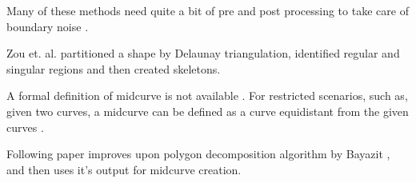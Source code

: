 Many of these methods need quite a bit of pre and post processing to take care of boundary noise \citep{Lien2004}. 

Zou et. al.\citep{Zou2001} partitioned a shape by Delaunay triangulation, identified regular and singular regions and then created skeletons.

A formal definition of midcurve is not available \citep{Ramanathan2004}. For restricted scenarios, such as, given two curves, a midcurve can be defined as a curve equidistant from the given curves \citep{Elber1999}.

Following paper improves upon polygon decomposition algorithm by Bayazit \citep{Bayazit}, and then uses it's output for midcurve creation.

